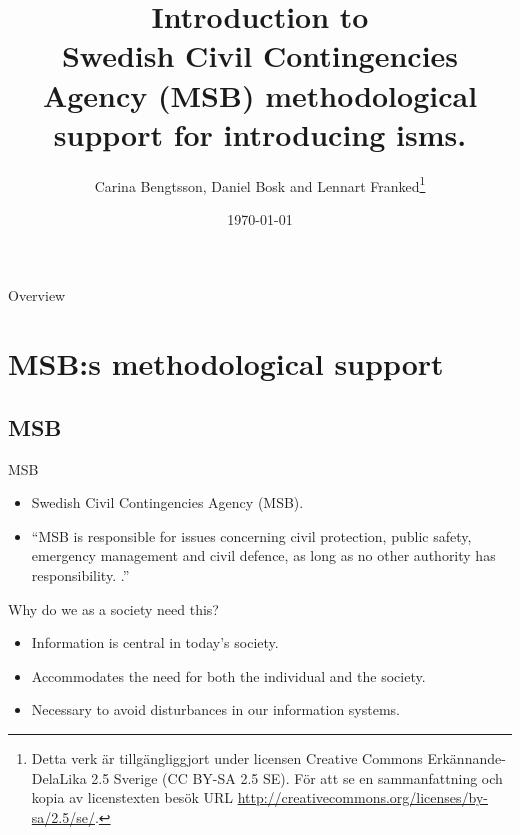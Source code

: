 \documentclass{beamer}
\title[Intro MSB]{%
  Introduction to\\
  Swedish Civil Contingencies Agency (MSB) methodological support for introducing \ac{isms}.
}
\author{Carina Bengtsson, Daniel Bosk and Lennart Franked\footnote{%
  Detta verk är tillgängliggjort under licensen Creative Commons 
  Erkännande-DelaLika 2.5 Sverige (CC BY-SA 2.5 SE).
	För att se en sammanfattning och kopia av licenstexten besök URL 
	\url{http://creativecommons.org/licenses/by-sa/2.5/se/}.
}}
\institute[MIUN IST]{%
  Department of Informationsystem and Technologies (IST),\\
  Mid Sweden University, Sundsvall.
	
}
\date{\today}
\begin{document}
\begin{frame}
  \titlepage{}
\end{frame}

\begin{frame}{Overview}
	\tableofcontents
\end{frame}





\section[Methodilogical support]{MSB:s methodological support}

\subsection{MSB}

\begin{frame}{MSB}
  \begin{itemize}
    \item Swedish Civil Contingencies Agency (MSB).
    \item \enquote{MSB is responsible for issues concerning civil protection,
        public safety, emergency management and civil defence, as long as no
        other authority has responsibility\cite[About MSB]{msbse}\@.
        .}
  \end{itemize}
\end{frame}


\begin{frame}{Why do we as a society need this?}
  \begin{itemize}
    \item Information is central in today's society.
    \item Accommodates the need for both the individual and the society.
    \item Necessary to avoid disturbances in our information systems.
  \end{itemize}
\end{frame}
\end{document}
